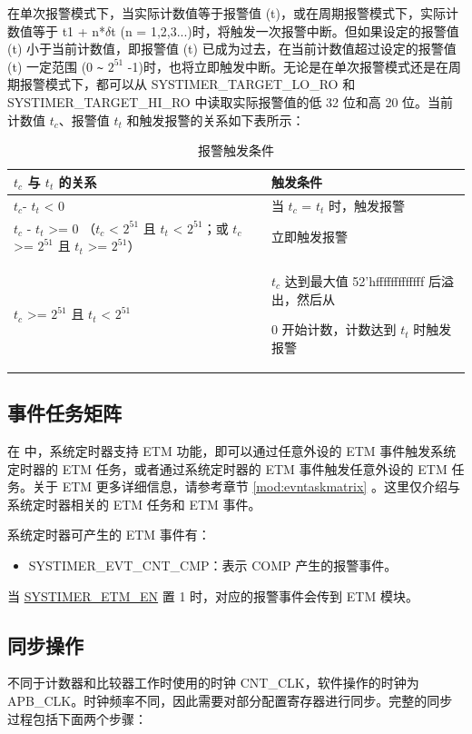 \documentclass[main\_\_CN.tex]{subfiles}
\begin{document}
在单次报警模式下，当实际计数值等于报警值 (t)，或在周期报警模式下，实际计数值等于 t1 + n*$\delta$t (n = 1,2,3...)时，将触发一次报警中断。但如果设定的报警值 (t) 小于当前计数值，即报警值 (t) 已成为过去，在当前计数值超过设定的报警值 (t) 一定范围 (0 \verb+~+ $2^{51}$ -1)时，也将立即触发中断。无论是在单次报警模式还是在周期报警模式下，都可以从 SYSTIMER\_TARGET\_LO\_RO 和 SYSTIMER\_TARGET\_HI\_RO 中读取实际报警值的低 32 位和高 20 位。当前计数值 $t_{c}$、报警值 $t_{t}$ 和触发报警的关系如下表所示：

\begin{longtable}[c]{ | p{4cm} | p{6.5cm} |}
\caption{报警触发条件}
\\\hline
\rowcolor{lightgray}
\textbf{$t_{c}$ 与 $t_{t}$ 的关系}  & \textbf{触发条件} \\ \hline
$t_{c}$- $t_{t}$ < 0 & 当 $t_{c}$ = $t_{t}$ 时，触发报警\\ \hline
$t_{c}$ - $t_{t}$ >= 0 \newline （$t_{c}$ < $2^{51}$ 且 $t_{t}$ < $2^{51}$；\newline 或 $t_{c}$ >= $2^{51}$ 且 $t_{t}$ >= $2^{51}$）& 立即触发报警\\ \hline
\multirow{2}{*}{$t_{c}$ >= $2^{51}$ 且 $t_{t}$ < $2^{51}$} & $t_{c}$ 达到最大值 52'hfffffffffffff 后溢出，然后从

0 开始计数，计数达到 $t_{t}$ 时触发报警 \\ \hline
\end{longtable}

\subsection{事件任务矩阵}
在 \chipname{} 中，系统定时器支持 ETM 功能，即可以通过任意外设的 ETM 事件触发系统定时器的 ETM 任务，或者通过系统定时器的 ETM 事件触发任意外设的 ETM 任务。关于 ETM 更多详细信息，请参考章节 \ref{mod:evntaskmatrix} 。这里仅介绍与系统定时器相关的 ETM 任务和 ETM 事件。

系统定时器可产生的 ETM 事件有：

\begin{itemize}
\item SYSTIMER\_EVT\_CNT\_CMP：表示 COMP 产生的报警事件。
\end{itemize}

当 \hyperref[fielddesc:SYSTIMERETMEN]{SYSTIMER\_ETM\_EN} 置 1 时，对应的报警事件会传到 ETM 模块。

\subsection{同步操作}
不同于计数器和比较器工作时使用的时钟 CNT\_CLK，软件操作的时钟为 APB\_CLK。时钟频率不同，因此需要对部分配置寄存器进行同步。完整的同步过程包括下面两个步骤：
\end{document}
